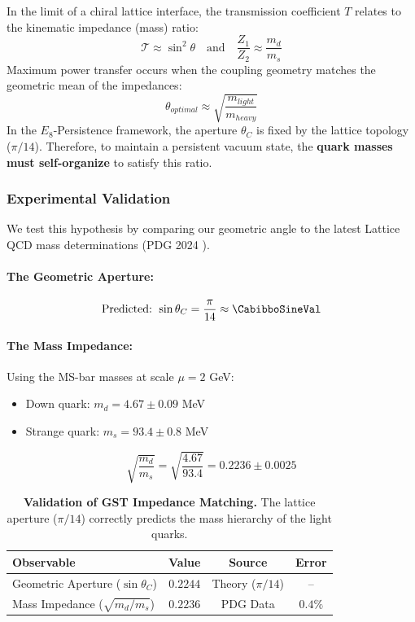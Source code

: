 In the limit of a chiral lattice interface, the transmission coefficient $T$ relates to the kinematic impedance (mass) ratio:
\begin{equation}
    \mathcal{T} \approx \sin^2 \theta \quad \text{and} \quad \frac{Z_1}{Z_2} \approx \frac{m_d}{m_s}
\end{equation}
Maximum power transfer occurs when the coupling geometry matches the geometric mean of the impedances:
\begin{equation}
\boxed{
    \theta_{optimal} \approx \sqrt{\frac{m_{light}}{m_{heavy}}}
}
\label{eq:impedance_matching}
\end{equation}
In the $E_8$-Persistence framework, the aperture $\theta_C$ is fixed by the lattice topology ($\pi/14$). Therefore, to maintain a persistent vacuum state, the \textbf{quark masses must self-organize} to satisfy this ratio.

\subsubsection{Experimental Validation}
We test this hypothesis by comparing our geometric angle to the latest Lattice QCD mass determinations (PDG 2024 \cite{navas_review_2024}).

\paragraph{The Geometric Aperture:}
\begin{equation}
    \text{Predicted: } \sin\theta_C = \frac{\pi}{14} \approx \CabibboSineVal
\end{equation}

\paragraph{The Mass Impedance:}
Using the MS-bar masses at scale $\mu = 2$ GeV:
\begin{itemize}
    \item Down quark: $m_d = 4.67 \pm 0.09$ MeV
    \item Strange quark: $m_s = 93.4 \pm 0.8$ MeV
\end{itemize}
\begin{equation}
    \sqrt{\frac{m_d}{m_s}} = \sqrt{\frac{4.67}{93.4}} = 0.2236 \pm 0.0025
\end{equation}

\begin{table}[h]
\centering
\caption{\textbf{Validation of GST Impedance Matching.} The lattice aperture ($\pi/14$) correctly predicts the mass hierarchy of the light quarks.}
\begin{tabular}{lccc}
\toprule
\textbf{Observable} & \textbf{Value} & \textbf{Source} & \textbf{Error} \\
\midrule
Geometric Aperture ($\sin\theta_C$) & $\mathbf{0.2244}$ & Theory ($\pi/14$) & -- \\
Mass Impedance ($\sqrt{m_d/m_s}$) & $\mathbf{0.2236}$ & PDG Data & $\mathbf{0.4\%}$ \\
\bottomrule
\end{tabular}
\label{tab:gst_validation}
\end{table}

